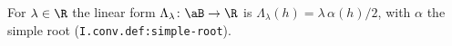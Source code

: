 For $\lambda\in\R$ the linear form $\Lambda_\lambda\colon\aB\to\R$ is $\Lambda_\lambda(h)=\lambda\,\alpha(h)/2$, with $\alpha$ the simple root
(\texttt{I.conv.def:simple-root}).
